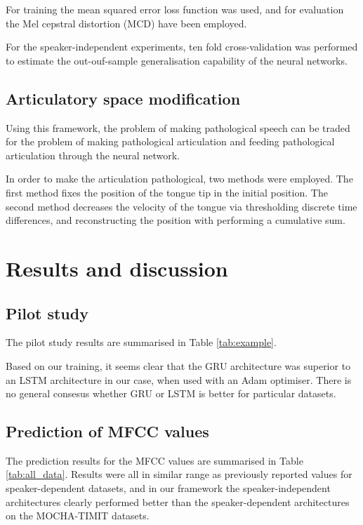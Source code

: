 \documentclass[a4paper]{article}
\begin{document}
For training the mean squared error loss function was used, and for
evaluation the Mel cepstral distortion (MCD) have been employed. \cite{Kubichek1993}

For the speaker-independent experiments, ten fold cross-validation was performed
to estimate the out-ouf-sample generalisation capability of the neural networks.

\subsection{Articulatory space modification} \label{section:speech}

Using this framework, the problem of making pathological speech
can be traded for the problem of making pathological articulation and
feeding pathological articulation through the neural network.

In order to make the articulation pathological, two methods were employed.
The first method fixes the position of the tongue tip in the initial position.
The second method decreases the velocity of the tongue via thresholding discrete time differences,
and reconstructing the position with performing a cumulative sum.




\section{Results and discussion}

\subsection{Pilot study}

The pilot study results are summarised in Table \ref{tab:example}.

Based on our training, it seems clear that the GRU architecture was superior to an LSTM
architecture in our case, when used with an Adam optimiser.
There is no general consesus whether GRU or LSTM is better for particular
datasets. \cite{Jozefowicz2015}

\subsection{Prediction of MFCC values}

The prediction results for the MFCC values are summarised in Table
\ref{tab:all_data}. Results were all in similar range as previously
reported values for speaker-dependent datasets, and in our framework
the speaker-independent architectures clearly performed better than the
speaker-dependent architectures on the MOCHA-TIMIT datasets.
\end{document}
